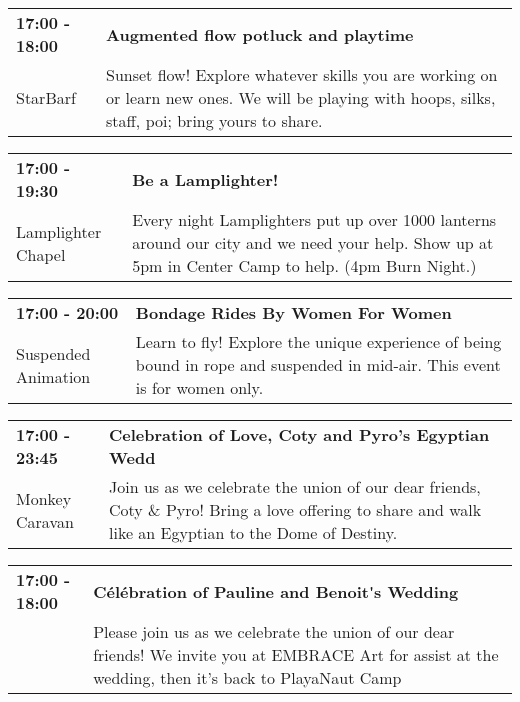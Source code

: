 \begin{tabular}{ p{1in} p{2.2in} }
    \textbf{17:00 - 18:00} & \textbf{Augmented flow potluck and playtime} \\
    StarBarf \newline  & Sunset flow! Explore whatever skills you are working on or learn new ones. We will be playing with hoops, silks, staff, poi; bring yours to share. \\
    \hline 
\end{tabular}
    
\begin{tabular}{ p{1in} p{2.2in} }
    \textbf{17:00 - 19:30} & \textbf{Be a Lamplighter!} \\
    Lamplighter Chapel \newline  & Every night Lamplighters put up over 1000 lanterns around our city and we need your help. Show up at 5pm in Center Camp to help. (4pm Burn Night.) \\
    \hline 
\end{tabular}
    
\begin{tabular}{ p{1in} p{2.2in} }
    \textbf{17:00 - 20:00} & \textbf{Bondage Rides By Women For Women} \\
    Suspended Animation \newline  & Learn to fly! Explore the unique experience of being bound in rope and suspended in mid-air. This event is for women only. \\
    \hline 
\end{tabular}
    
\begin{tabular}{ p{1in} p{2.2in} }
    \textbf{17:00 - 23:45} & \textbf{Celebration of Love, Coty and Pyro's Egyptian Wedd} \\
    Monkey Caravan \newline  & Join us as we celebrate the union of our dear friends, Coty \& Pyro! Bring a love offering to share and walk like an Egyptian to the Dome of Destiny. \\
    \hline 
\end{tabular}
    
\begin{tabular}{ p{1in} p{2.2in} }
    \textbf{17:00 - 18:00} & \textbf{C\'el\'ebration of Pauline and Benoit\'{}s Wedding} \\
    ~ \newline  & Please join us as we celebrate the union of our dear friends! We invite you at EMBRACE Art for assist at the wedding, then it's back to PlayaNaut Camp \\
    \hline 
\end{tabular}
    
